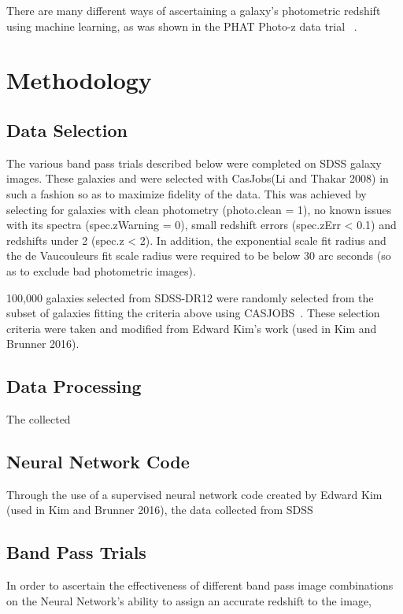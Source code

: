 \documentclass[fleqn,usenatbib]{mnras}
\begin{document}
There are many different ways of ascertaining a galaxy's photometric redshift using machine learning, as was shown in the PHAT Photo-z data trial ~\citep{hildebrandt_phat}.
  
\section{Methodology}
  \label{sec:method}

\subsection{Data Selection}
   \label{sec:data_sel}   
The various band pass trials described below were completed on SDSS galaxy images.  These galaxies and were selected with CasJobs(Li and Thakar 2008) in such a fashion so as to maximize fidelity of the data.  This was achieved by selecting for galaxies with clean photometry (photo.clean = 1), no known issues with its spectra (spec.zWarning = 0), small redshift errors (spec.zErr < 0.1) and redshifts under 2 (spec.z < 2).  In addition, the exponential scale fit radius and the de Vaucouleurs fit scale radius were required to be below 30 arc seconds (so as to exclude bad photometric images).

100,000 galaxies selected from SDSS-DR12 were randomly selected from the subset of galaxies fitting the criteria above using CASJOBS~\citep{thakar_casjobs}.  These selection criteria were taken and modified from Edward Kim's work (used in Kim and Brunner 2016).

\subsection{Data Processing}
  \label{sec:data_proc}
The collected 


\subsection{Neural Network Code}
  \label{sec:code}
Through the use of a supervised neural network code created by Edward Kim (used in Kim and Brunner 2016), the data collected from SDSS

\subsection{Band Pass Trials}
   \label{sec:bandmethod}
In order to ascertain the effectiveness of different band pass image combinations on the Neural Network's ability to assign an accurate redshift to the image, 
\end{document}

